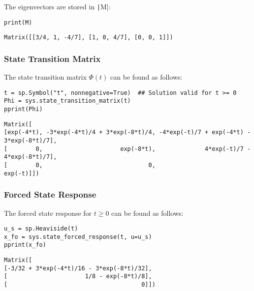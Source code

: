 The eigenvectors are stored in \texttt|M|:

\label{cabd61bc}
\nointerlineskip\nointerlineskip\begin{verbatim}
print(M)
\end{verbatim}

\nointerlineskip\nointerlineskip\begin{verbatim}
Matrix([[3/4, 1, -4/7], [1, 0, 4/7], [0, 0, 1]])
\end{verbatim}

\label{1a782013}
\subsubsection{State Transition Matrix}\label{state-transition-matrix}

The state transition matrix $\Phi(t)$ can be found as follows:

\label{a4b9b93a}
\nointerlineskip\nointerlineskip\begin{verbatim}
t = sp.Symbol("t", nonnegative=True)  ## Solution valid for t >= 0
Phi = sys.state_transition_matrix(t)
pprint(Phi)
\end{verbatim}

\nointerlineskip\nointerlineskip\begin{verbatim}
Matrix([
[exp(-4*t), -3*exp(-4*t)/4 + 3*exp(-8*t)/4, -4*exp(-t)/7 + exp(-4*t) - 3*exp(-8*t)/7],
[        0,                      exp(-8*t),              4*exp(-t)/7 - 4*exp(-8*t)/7],
[        0,                              0,                                  exp(-t)]])
\end{verbatim}

\label{fb0f8d0b}
\subsubsection{Forced State Response}\label{forced-state-response}

The forced state response for $t \ge 0$ can be found as follows:

\label{2adb3ba2}
\nointerlineskip\nointerlineskip\begin{verbatim}
u_s = sp.Heaviside(t)
x_fo = sys.state_forced_response(t, u=u_s)
pprint(x_fo)
\end{verbatim}

\nointerlineskip\nointerlineskip\begin{verbatim}
Matrix([
[-3/32 + 3*exp(-4*t)/16 - 3*exp(-8*t)/32],
[                      1/8 - exp(-8*t)/8],
[                                      0]])
\end{verbatim}

